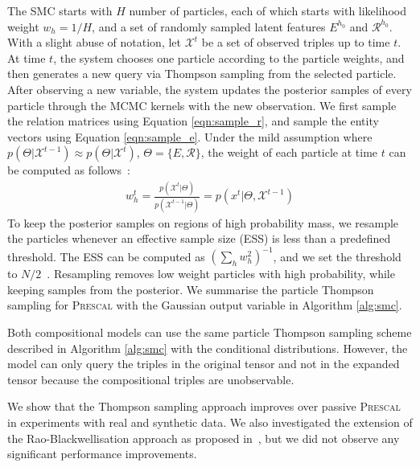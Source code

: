The SMC starts with $H$ number of particles, each of which starts with likelihood
weight $w_{h} = 1/H$, and a set of randomly sampled latent features $E^{h_0}$ and $\mathcal{R}^{h_0}$.
With a slight abuse of notation, let $\mathcal{X}^{t}$ be a set of observed triples up to time $t$.
At time $t$, the system chooses one particle according to the particle weights,
and then generates a new query via Thompson sampling from the selected particle.
After observing a new variable, the system updates the posterior samples of
every particle through the MCMC kernels with the new observation.
We first sample the relation matrices using Equation \ref{eqn:sample_r}, and sample the entity vectors using Equation \ref{eqn:sample_e}.
Under the mild assumption where
$p(\Theta | \mathcal{X}^{t-1}) \approx p(\Theta | \mathcal{X}^{t})$, $\Theta = \{E, \mathcal{R}\}$,
the weight of each particle at time $t$ can be computed as follows~\cite{del2006sequential}:
\begin{align}
w_{h}^{t} = \frac{p(\mathcal{X}^{t} | \Theta)}{p(\mathcal{X}^{t-1} | \Theta)}
 = p(x^{t} | \Theta, \mathcal{X}^{t-1})
\end{align}
To keep the posterior samples
on regions of high probability mass, we resample the particles whenever
an effective sample size (ESS) is less than a predefined threshold.
The ESS can be computed as $(\sum_h w_h^2)^{-1}$, and we set the threshold
to $N/2$~\cite{Doucet2011}. Resampling removes low weight particles with high probability,
while keeping samples from the posterior.
We summarise the particle Thompson sampling for \textsc{Prescal} with the
Gaussian output variable in Algorithm \ref{alg:smc}.

Both compositional models can use the same
particle Thompson sampling scheme described in Algorithm \ref{alg:smc} with the conditional distributions.
However, the model can only query the triples in the original tensor and
not in the expanded tensor because the compositional triples are unobservable.

We show that the Thompson sampling approach improves over passive \textsc{Prescal} in
experiments with real and synthetic data.
We also investigated the extension of the Rao-Blackwellisation approach as proposed
in~\cite{kawale2015efficient}, but we did not observe any significant performance improvements.

